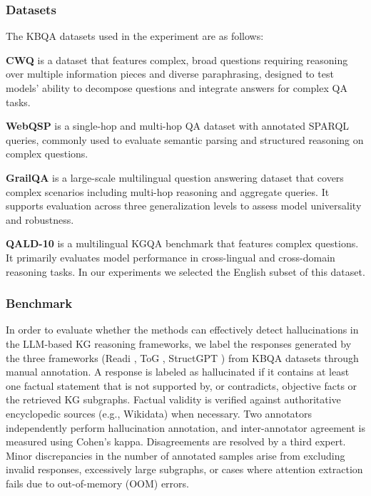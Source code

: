 \documentclass[11pt]{article}
\begin{document}
\subsubsection{Datasets}
\label{dataset}
The KBQA datasets used in the experiment are as follows:

\textbf{CWQ} \cite{talmor2018web} is a dataset that features complex, broad questions requiring reasoning over multiple information pieces and diverse paraphrasing, designed to test models' ability to decompose questions and integrate answers for complex QA tasks.

\textbf{WebQSP} \cite{yih2016value} is a single-hop and multi-hop QA dataset with annotated SPARQL queries, commonly used to evaluate semantic parsing and structured reasoning on complex questions.

\textbf{GrailQA} \cite{gu2021beyond} is a large-scale multilingual question answering dataset that covers complex scenarios including multi-hop reasoning and aggregate queries. It supports evaluation across three generalization levels to assess model universality and robustness.

\textbf{QALD-10} \cite{perevalov2022qald} is a multilingual KGQA benchmark that features complex questions. It primarily evaluates model performance in cross-lingual and cross-domain reasoning tasks. In our experiments we selected the English subset of this dataset.


\subsubsection{Benchmark}

In order to evaluate whether the methods can effectively detect hallucinations in the LLM-based KG reasoning frameworks, we label the responses generated by the three frameworks (Readi \cite{cheng2024call}, ToG \cite{sun2023think}, StructGPT \cite{jiang2023structgpt}) from KBQA datasets through manual annotation.
A response is labeled as hallucinated if it contains at least one factual statement that is not supported by, or contradicts, objective facts or the retrieved KG subgraphs. Factual validity is verified against authoritative encyclopedic sources (e.g., Wikidata) when necessary. Two annotators independently perform hallucination annotation, and inter-annotator agreement is measured using Cohen’s kappa. Disagreements are resolved by a third expert. Minor discrepancies in the number of annotated samples arise from excluding invalid responses, excessively large subgraphs, or cases where attention extraction fails due to out-of-memory (OOM) errors.
\end{document}
